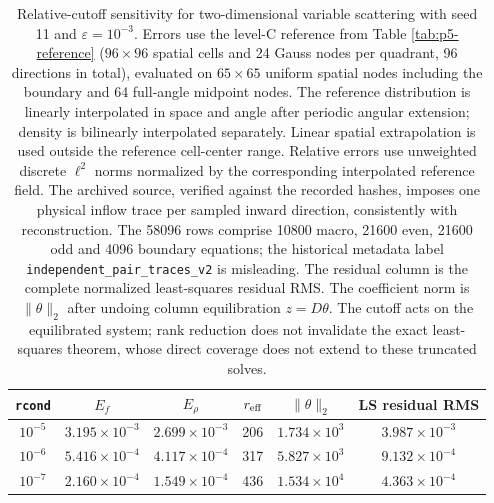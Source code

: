 \begin{table}[!htb]
\centering\small
\setlength{\tabcolsep}{4pt}
\caption{Relative-cutoff sensitivity for two-dimensional variable scattering with seed 11 and $\varepsilon=10^{-3}$. Errors use the level-C reference from Table \ref{tab:p5-reference} ($96\times96$ spatial cells and 24 Gauss nodes per quadrant, 96 directions in total), evaluated on $65\times65$ uniform spatial nodes including the boundary and 64 full-angle midpoint nodes. The reference distribution is linearly interpolated in space and angle after periodic angular extension; density is bilinearly interpolated separately. Linear spatial extrapolation is used outside the reference cell-center range. Relative errors use unweighted discrete $\ell^2$ norms normalized by the corresponding interpolated reference field. The archived source, verified against the recorded hashes, imposes one physical inflow trace per sampled inward direction, consistently with reconstruction. The 58096 rows comprise 10800 macro, 21600 even, 21600 odd and 4096 boundary equations; the historical metadata label \texttt{independent\_pair\_traces\_v2} is misleading. The residual column is the complete normalized least-squares residual RMS. The coefficient norm is $\|\theta\|_2$ after undoing column equilibration $z=D\theta$. The cutoff acts on the equilibrated system; rank reduction does not invalidate the exact least-squares theorem, whose direct coverage does not extend to these truncated solves.}
\label{tab:p5-cutoff}
\begin{tabular}{cccccc}
\toprule
\texttt{rcond} & $E_f$ & $E_\rho$ & $r_{\rm eff}$ & $\|\theta\|_2$ & LS residual RMS\\
\midrule
$10^{-5}$ & $3.195\times10^{-3}$ & $2.699\times10^{-3}$ & 206 & $1.734\times10^3$ & $3.987\times10^{-3}$\\
$10^{-6}$ & $5.416\times10^{-4}$ & $4.117\times10^{-4}$ & 317 & $5.827\times10^3$ & $9.132\times10^{-4}$\\
$10^{-7}$ & $2.160\times10^{-4}$ & $1.549\times10^{-4}$ & 436 & $1.534\times10^4$ & $4.363\times10^{-4}$\\
\bottomrule
\end{tabular}
\end{table}

